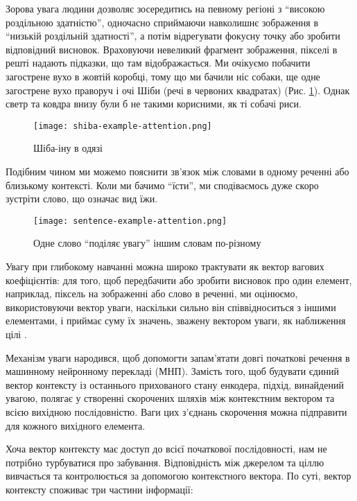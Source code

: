 Зорова увага людини дозволяє зосередитись на певному регіоні з
``високою роздільною здатністю'', одночасно сприймаючи навколишнє
зображення в ``низькій роздільній здатності'', а потім відрегувати
фокусну точку або зробити відповідний висновок.
Враховуючи невеликий фрагмент зображення, пікселі в решті надають підказки, що
там відображається. Ми очікуємо побачити загострене вухо в жовтій коробці,
тому що ми бачили ніс собаки, ще одне загострене вухо праворуч і очі
Шіби (речі в червоних квадратах) (Рис. \ref{fig:shiba}). Однак
светр та ковдра внизу були
б не такими корисними, як ті собачі риси.

\begin{figure}[H]
    \centering
    \texttt{[image: shiba-example-attention.png]}
    \caption{Шіба-іну в одязі}
    \label{fig:shiba}
\end{figure}

Подібним чином ми можемо пояснити зв'язок між словами в одному реченні
або близькому контексті. Коли ми бачимо ``їсти'', ми сподіваємось дуже
скоро зустріти слово, що означає вид їжи.

\begin{figure}[H]
    \centering
    \texttt{[image: sentence-example-attention.png]}
    \caption{Одне слово ``поділяє увагу'' іншим словам по-різному}
    \label{fig:attend-example}
\end{figure}

Увагу при глибокому навчанні можна широко трактувати як вектор вагових
коефіцієнтів: для того, щоб передбачити або зробити висновок про один елемент,
наприклад, піксель на зображенні або слово в реченні, ми оцінюємо,
використовуючи вектор уваги, наскільки сильно він співвідноситься з іншими
елементами,
і приймає суму їх значень, зважену вектором уваги, як наближення
цілі \cite{attention}.

Механізм уваги народився, щоб допомогти запам’ятати довгі початкові
речення в машинному нейронному перекладі (МНП). Замість того,
щоб будувати єдиний вектор контексту із останнього прихованого стану
енкодера, підхід, винайдений увагою, полягає у створенні
скорочених шляхів між контекстним вектором та
всією вихідною послідовністю. Ваги цих з'єднань скорочення
можна підправити для кожного вихідного елемента.

Хоча вектор контексту має доступ до всієї початкової послідовності,
нам не потрібно турбуватися про забування.
Відповідність між джерелом та ціллю вивчається та контролюється
за допомогою контекстного вектора. По суті, вектор контексту
споживає три частини інформації:

